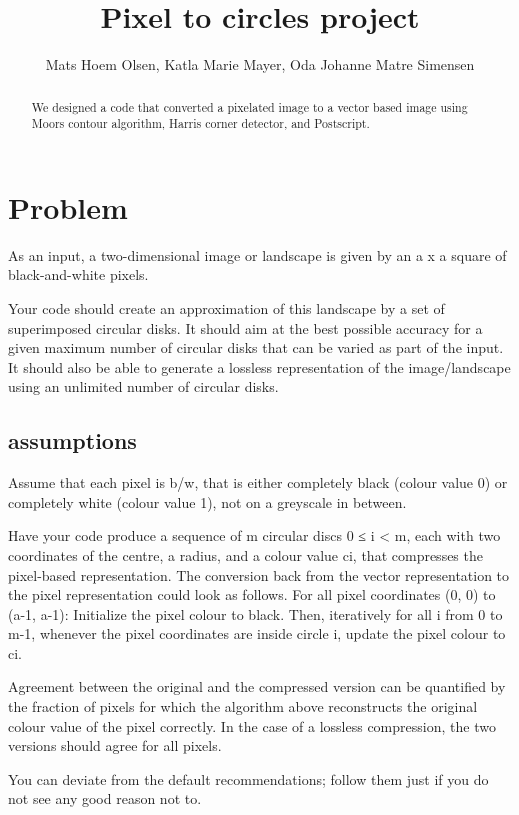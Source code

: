 \documentclass{article}
\title{Pixel to circles project}
\author{Mats Hoem Olsen, Katla Marie Mayer, Oda Johanne Matre Simensen}
\begin{document}
	\maketitle
	\tableofcontents
	\listofalgorithms
	\begin{abstract}
		We designed a code that converted a pixelated image to a vector based image using Moors contour algorithm, Harris corner detector, and Postscript\texttrademark. 
	\end{abstract}
	\newpage


	\section{Problem}
	As an input, a two-dimensional image or landscape is given by an a x a square of black-and-white pixels.

	Your code should create an approximation of this landscape by a set of superimposed circular disks. It should aim at the best possible accuracy for a given maximum number of circular disks that can be varied as part of the input. It should also be able to generate a lossless representation of the image/landscape using an unlimited number of circular disks.

	\subsection{assumptions}
	Assume that each pixel is b/w, that is either completely black (colour value 0) or completely white (colour value 1), not on a greyscale in between.

	Have your code produce a sequence of m circular discs 0 ≤ i < m, each with two coordinates of the centre, a radius, and a colour value ci, that compresses the pixel-based representation. The conversion back from the vector representation to the pixel representation could look as follows. For all pixel coordinates (0, 0) to (a-1, a-1): Initialize the pixel colour to black. Then, iteratively for all i from 0 to m-1, whenever the pixel coordinates are inside circle i, update the pixel colour to ci.

	Agreement between the original and the compressed version can be quantified by the fraction of pixels for which the algorithm above reconstructs the original colour value of the pixel correctly. In the case of a lossless compression, the two versions should agree for all pixels.

	You can deviate from the default recommendations; follow them just if you do not see any good reason not to.
\end{document}
